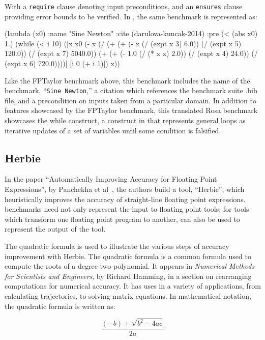 \documentclass[main.tex]{subfiles}
\begin{document}
With a \verb|require| clause denoting input preconditions, and an
\verb|ensures| clause providing error bounds to be verified. In
\name, the same benchmark is represented as:

\begin{code}
(lambda (x0)
  :name "Sine Newton"
  :cite (darulova-kuncak-2014)
  :pre (< (abs x0) 1.)
  (while (< i 10)
    ([x x0 (- x (/ (+ (+ (- x (/ (expt x 3) 6.0)) 
                         (/ (expt x 5) 120.0))
                      (/ (expt x 7) 5040.0))
                   (+ (+ (- 1.0 (/ (* x x) 2.0)) 
                         (/ (expt x 4) 24.0)) 
                      (/ (expt x 6) 720.0))))]
     [i 0 (+ i 1)])
    x))
\end{code}

Like the FPTaylor benchmark above, this benchmark includes the name of
the benchmark, ``\verb|Sine Newton|,'' a citation which references the
benchmark suite .bib file, and a precondition on inputs taken from a
particular domain. In addition to features showcased by the FPTaylor
benchmark, this translated Rosa benchmark showcases the while
construct, a construct in \core that represents general loops as
iterative updates of a set of variables until some condition is
falsified.

\subsection{Herbie}

In the paper ``Automatically Improving Accuracy for Floating Point
Expressions'', by Panchekha et al~\cite{pavel15}, the authors build a
tool, ``Herbie'', which heuristically improves the accuracy of
straight-line floating point expressions. \name benchmarks need not
only represent the input to floating point tools; for tools which
transform one floating point program to another, \core can also be
used to represent the output of the tool.

The quadratic formula is used to illustrate the various steps of
accuracy improvement with Herbie. The quadratic formula is a common
formula used to compute the roots of a degree two polynomial. It
appears in \textit{Numerical Methods for Scientists and Engineers}, by
Richard Hamming, in a section on rearranging computations for
numerical accuracy. It has uses in a variety of applications, from
calculating trajectories, to solving matrix equations. In mathematical
notation, the quadratic formula is written as:

\begin{equation}
  \frac{(- b) \pm \sqrt{b^2 - 4ac}}{2a}
\end{equation}
\end{document}
